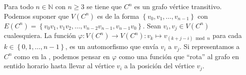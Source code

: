 \begin{Ejm}
   Para todo $n\in\mathbb{N}$ con $n\ge 3$ se tiene que $C^n$ es un grafo vértice transitivo. Podemos suponer que $V(C^n)$ es de la forma $\left\lbrace v_0,v_1, \dots, v_{n-1}\right\rbrace$ con $E(C^n)=\left\lbrace v_0v_1, v_1v_2, \dots ,v_{n-2}v_{n-1}, v_{n-1}v_0\right\rbrace$. Sean $v_i,v_j\in V(C^n)$ cualesquiera. La función $\varphi :V(C^n)\to V(C^n):v_k\mapsto v_{(k+j-i)\bmod n}$ para cada $k\in\left\lbrace 0,1,\dots ,n-1\right\rbrace$, es un automorfismo que envía $v_i$ a $v_j$. Si representamos a $C^n$ como en la , podemos pensar en $\varphi$ como una función que ``rota'' al grafo en sentido horario hasta llevar al vértice $v_i$ a la posición del vértice $v_j$.
   
\end{Ejm}
